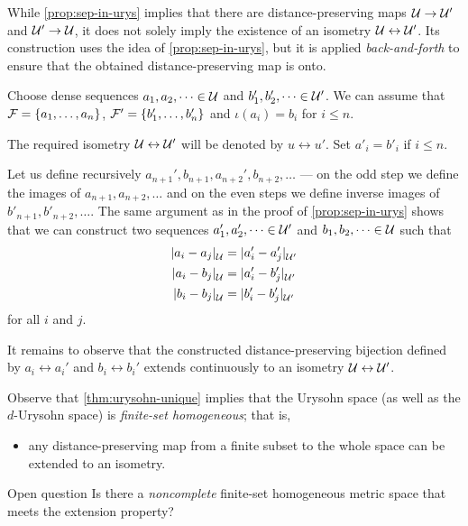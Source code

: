 While \ref{prop:sep-in-urys} implies that there are distance-preserving maps $\mathcal{U}\to \mathcal{U}'$ and $\mathcal{U}'\to \mathcal{U}$,
it does not solely imply the existence of an isometry $\mathcal{U}\leftrightarrow \mathcal{U}'$.
Its construction uses the idea of \ref{prop:sep-in-urys}, but it is applied {}\emph{back-and-forth} to ensure that the obtained distance-preserving map is onto.


Choose dense sequences $a_1,a_2,\dots\in \mathcal{U}$ and $b'_1,b'_2,\dots\in \mathcal{U}'$.
We can assume that $\mathcal{F}=\{a_1,\dots,a_n\}$, $\mathcal{F}'=\{b_1',\dots,b_n'\}$ and $\iota(a_i)=b_i$ for $i\le n$.

The required isometry $\mathcal{U}\leftrightarrow \mathcal{U}'$ will be denoted by $u \leftrightarrow u'$.
Set $a'_i=b'_i$ if $i\le n$.

Let us define recursively $a_{n+1}',b_{n+1}, a_{n+2}', b_{n+2},\dots$ --- on the odd step we define the images of $a_{n+1},a_{n+2},\dots$ and on the even steps we define inverse images of $b'_{n+1},b'_{n+2},\dots$.
The same argument as in the proof of \ref{prop:sep-in-urys} shows that we can construct two sequences $a_1',a_2',\dots\in \mathcal{U}'$ and $b_1,b_2,\dots\in \mathcal{U}$ such that
\begin{align*}
\dist{a_i}{a_j}{\spc{U}}&=\dist{a_i'}{a_j'}{\spc{U}'}
\\
\dist{a_i}{b_j}{\spc{U}}&=\dist{a_i'}{b_j'}{\spc{U}'}
\\
\dist{b_i}{b_j}{\spc{U}}&=\dist{b_i'}{b_j'}{\spc{U}'}
\end{align*}
for all $i$ and $j$.

It remains to observe that the constructed distance-preserving bijection defined by $a_i\leftrightarrow a_i'$ and $b_i\leftrightarrow b_i'$ extends
continuously to an isometry $\mathcal{U}\leftrightarrow \mathcal{U}'$. 
\qeds

Observe that \ref{thm:urysohn-unique} implies that the Urysohn space (as well as the $d$-Urysohn space) is \emph{finite-set homogeneous}; that is,
\begin{itemize}
 \item any distance-preserving map from a finite subset to the whole space can be extended to an isometry.
\end{itemize}

\begin{thm}{Open question}
Is there a {}\emph{noncomplete} finite-set homogeneous metric space that meets the extension property?
\end{thm}

